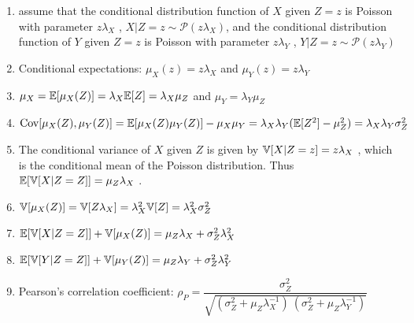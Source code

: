 \begin{enumerate}
    \item assume that the conditional distribution function of $X$ given $Z = z$ is Poisson with parameter $z\lambda_X$ , $X|Z = z \sim \mathcal{P}(z\lambda_X )$, and the conditional distribution function of $Y$ given $Z = z$ is Poisson with parameter $z\lambda_Y$ , $Y |Z = z \sim \mathcal{P}(z\lambda_Y )$
    \hfill \cite{statistics/book/Statistics-for-Data-Scientists/Maurits-Kaptein}

    \item Conditional expectations: $\mu_X (z) = z\lambda_X$ and $\mu_Y (z) = z\lambda_Y$
    \hfill \cite{statistics/book/Statistics-for-Data-Scientists/Maurits-Kaptein}

    \item $\mu_X = \mathbb{E}[\mu_X (Z )] = \lambda_X \mathbb{E}[Z] = \lambda_X \mu_Z$ and $\mu_Y = \lambda_Y \mu_Z$
    \hfill \cite{statistics/book/Statistics-for-Data-Scientists/Maurits-Kaptein}

    \item
    $
        \text{Cov}[\mu_X (Z ), \mu_Y (Z )]
        = \mathbb{E}[\mu_X (Z )\mu_Y (Z )] - \mu_X \mu_Y
        = \lambda_X \lambda_Y ( \mathbb{E}[Z^2] - \mu^2_Z )
        = \lambda_X \lambda_Y \sigma^2_Z
    $
    \hfill \cite{statistics/book/Statistics-for-Data-Scientists/Maurits-Kaptein}

    \item The conditional variance of $X$ given $Z$ is given by $\mathbb{V}[X|Z = z] = z\lambda_X$ , which is the conditional mean of the Poisson distribution. Thus $\mathbb{E}[\mathbb{V}[X|Z = Z]] = \mu_Z \lambda_X$ .
    \hfill \cite{statistics/book/Statistics-for-Data-Scientists/Maurits-Kaptein}

    \item $\mathbb{V}[\mu_X (Z )] = \mathbb{V}[Z \lambda_X] = \lambda^2_X \mathbb{V}[Z] = \lambda^2_X \sigma^2_Z$
    \hfill \cite{statistics/book/Statistics-for-Data-Scientists/Maurits-Kaptein}

    \item $\mathbb{E}[\mathbb{V}[X|Z =Z]] + \mathbb{V}[\mu_X (Z)] = \mu_Z \lambda_X + \sigma^2_Z \lambda^2_X$
    \hfill \cite{statistics/book/Statistics-for-Data-Scientists/Maurits-Kaptein}

    \item $\mathbb{E}[\mathbb{V}[Y|Z =Z]] + \mathbb{V}[\mu_Y (Z)] = \mu_Z \lambda_Y + \sigma^2_Z \lambda^2_Y$
    \hfill \cite{statistics/book/Statistics-for-Data-Scientists/Maurits-Kaptein}

    \item Pearson’s correlation coefficient:
    $
        \rho_P = \dfrac{\sigma^2_Z}{\sqrt{(\sigma^2_Z + \mu_Z \lambda^{-1}_X )\ (\sigma^2_Z + \mu_Z \lambda^{-1}_Y )}}
    $
    \hfill \cite{statistics/book/Statistics-for-Data-Scientists/Maurits-Kaptein}
\end{enumerate}



